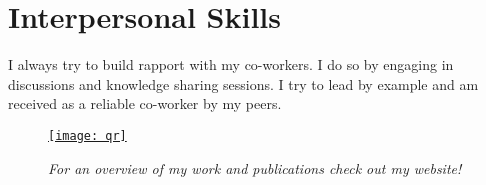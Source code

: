 \documentclass[a4paper]{twentysecondcv} %
\begin{document}
\vspace{0.6cm}

\section{Interpersonal Skills}

I always try to build rapport with my co-workers. I do so by engaging in discussions and knowledge sharing sessions. I try to lead by example and am received as a reliable co-worker by my peers.

\vspace{-0.5cm}
\begin{figure*}[b!]
	\hfill
	\begin{minipage}{.3\textwidth}\centering
		\href{https://www.robin-baumann.com}{\texttt{[image: qr]}}
		\caption{\small \textit{For an overview of my work and publications check out my website!}}
	\end{minipage}
\end{figure*}





\end{document}
